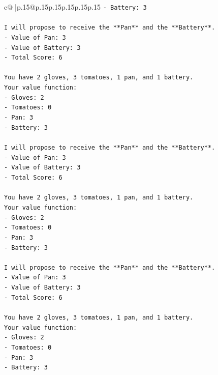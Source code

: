\documentclass{article}
\begin{document}
{\begin{supertabular}{c@{$\;$}|p{.15\linewidth}@{}p{.15\linewidth}p{.15\linewidth}p{.15\linewidth}p{.15\linewidth}p{.15\linewidth}}
{{{\texttt{{-} Battery: 3} \\
\\ 
\texttt{I will propose to receive the **Pan** and the **Battery**.} \\
\texttt{{-} Value of Pan: 3} \\
\texttt{{-} Value of Battery: 3} \\
\texttt{{-} Total Score: 6} \\
\\ 
\texttt{You have 2 gloves, 3 tomatoes, 1 pan, and 1 battery.} \\
\texttt{Your value function:} \\
\texttt{{-} Gloves: 2} \\
\texttt{{-} Tomatoes: 0} \\
\texttt{{-} Pan: 3} \\
\texttt{{-} Battery: 3} \\
\\ 
\texttt{I will propose to receive the **Pan** and the **Battery**.} \\
\texttt{{-} Value of Pan: 3} \\
\texttt{{-} Value of Battery: 3} \\
\texttt{{-} Total Score: 6} \\
\\ 
\texttt{You have 2 gloves, 3 tomatoes, 1 pan, and 1 battery.} \\
\texttt{Your value function:} \\
\texttt{{-} Gloves: 2} \\
\texttt{{-} Tomatoes: 0} \\
\texttt{{-} Pan: 3} \\
\texttt{{-} Battery: 3} \\
\\ 
\texttt{I will propose to receive the **Pan** and the **Battery**.} \\
\texttt{{-} Value of Pan: 3} \\
\texttt{{-} Value of Battery: 3} \\
\texttt{{-} Total Score: 6} \\
\\ 
\texttt{You have 2 gloves, 3 tomatoes, 1 pan, and 1 battery.} \\
\texttt{Your value function:} \\
\texttt{{-} Gloves: 2} \\
\texttt{{-} Tomatoes: 0} \\
\texttt{{-} Pan: 3} \\
\texttt{{-} Battery: 3} \\
}}}
\end{supertabular}}
\end{document}
